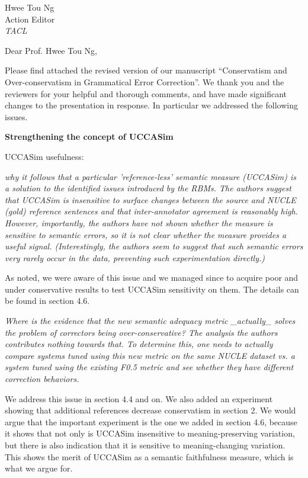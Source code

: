\documentclass[11pt,letterpaper]{letter}
\begin{document}
\begin{letter}{%
Hwee Tou Ng\\
Action Editor\\
{\em TACL}\\
}



  \opening{Dear Prof. Hwee Tou Ng,}
  
  Please find attached the revised version of our manuscript ``Conservatism and Over-conservatism in Grammatical Error Correction''. We thank you and the reviewers for your helpful and thorough comments, and have made significant changes to the presentation in response. In particular we addressed the following issues.

{\bf Strengthening the concept of UCCASim}

UCCASim usefulness:

\emph{why it follows that a
	particular 'reference-less' semantic measure (UCCASim) is a solution to the
	identified issues introduced by the RBMs. The authors suggest that UCCASim
	is insensitive to surface changes between the source and NUCLE (gold)
	reference sentences and that inter-annotator agreement is reasonably high.
	However, importantly, the authors have not shown whether the measure is
	sensitive to semantic errors, so it is not clear whether the measure
	provides a useful signal. (Interestingly, the authors seem to suggest that
	such semantic errors very rarely occur in the data, preventing such
	experimentation directly.)
}

As noted, we were aware of this issue and we managed since to acquire poor and under conservative results to test UCCASim sensitivity on them. The details can be found in section 4.6.

\emph{Where is the evidence that the new semantic adequacy metric \_actually\_
	solves the problem of correctors being over-conservative? The analysis the
	authors contributes nothing towards that. To determine this, one needs to
	actually compare systems tuned using this new metric on the same NUCLE
	dataset vs. a system tuned using the existing F0.5 metric and see whether
	they have different correction behaviors.
	}

We address this issue in section 4.4 and on. We also added an experiment showing that additional references decrease conservatism in section 2. We would argue that the important experiment is the one we added in section 4.6, because it shows that not only is UCCASim insensitive to meaning-preserving variation, but there is also indication that it is sensitive to meaning-changing variation. This shows the merit of UCCASim as a semantic faithfulness measure, which is what we argue for.


\end{letter}
\end{document}
